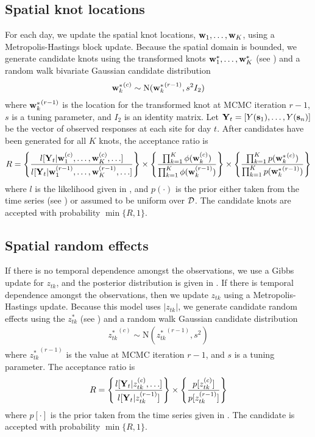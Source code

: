 \documentclass[useAMS,usenatbib,referee]{biomweb}
\begin{document}
\subsection*{Spatial knot locations}
For each day, we update the spatial knot locations, $\mbox{\bf w}_1, \ldots, \mbox{\bf w}_K$, using a Metropolis-Hastings block update.
Because the spatial domain is bounded, we generate candidate knots using the transformed knots $\mbox{\bf w}^*_1, \ldots, \mbox{\bf w}^*_K$ (see ) and a random walk bivariate Gaussian candidate distribution
\begin{align*}
	{ \mbox{\bf w}^*_k}^{(c)} \sim \text{N}({\mbox{\bf w}^*_k}^{(r - 1)}, s^2 I_2)
\end{align*}
where ${\mbox{\bf w}^*_k}^{(r - 1)}$ is the location for the transformed knot at MCMC iteration $r - 1$, $s$ is a tuning parameter, and $I_2$ is an identity matrix.
Let $\mbox{\bf Y}_t = [Y(\mbox{\bf s}_1), \ldots, Y(\mbox{\bf s}_n)]$ be the vector of observed responses at each site for day $t$.
After candidates have been generated for all $K$ knots, the acceptance ratio is
\begin{align*}
  R = \left\{ \frac{ l[ \mbox{\bf Y}_t | \mbox{\bf w}_1^{(c)}, \ldots, \mbox{\bf w}_K^{(c)}, \ldots] }{l[ \mbox{\bf Y}_t | \mbox{\bf w}_1^{(r - 1)}, \ldots, \mbox{\bf w}_K^{(r - 1)}, \ldots]} \right\} \times \left\{ \frac{ \prod_{k = 1}^{K}\phi(\mbox{\bf w}_k^{(c)})}{ \prod_{k = 1}^{K}\phi(\mbox{\bf w}_k^{(r - 1)})} \right\} \times \left\{ \frac{ \prod_{k = 1}^{K} p({\mbox{\bf w}^*_k}^{(c)})}{ \prod_{k = 1}^{K} p({\mbox{\bf w}^*_k}^{(r - 1)})}\right\}
\end{align*}
where $l$ is the likelihood given in , and $p(\cdot)$ is the prior either taken from the time series (see ) or assumed to be uniform over $\calD$.
The candidate knots are accepted with probability $\min\{R, 1\}$.

\subsection*{Spatial random effects}
If there is no temporal dependence amongst the observations, we use a Gibbs update for $z_{tk}$, and the posterior distribution is given in .
If there is temporal dependence amongst the observations, then we update $z_{tk}$ using a Metropolis-Hastings update.
Because this model uses $|z_{tk}|$, we generate candidate random effects using the $z^*_{tk}$ (see ) and a random walk Gaussian candidate distribution
\begin{align*}
  {z^*_{tk}}^{(c)} \sim \text{N}({z^*_{tk}}^{(r - 1)}, s^2)
\end{align*}
where ${z^*_{tk}}^{(r-1)}$ is the value at MCMC iteration $r - 1$, and $s$ is a tuning parameter.
The acceptance ratio is
\begin{align*}
  R = \left\{ \frac{ l[\mbox{\bf Y}_t | z_{tk}^{(c)}, \ldots] }{ l[\mbox{\bf Y}_t | z_{tk}^{(r - 1)}]} \right\} \times \left\{ \frac{ p[ z_{tk}^{(c)} ] }{ p[ z_{tk}^{(r - 1)}]}\right\}
\end{align*}
where $p[\cdot]$ is the prior taken from the time series given in .
The candidate is accepted with probability $\min\{R, 1\}$.
\end{document}
